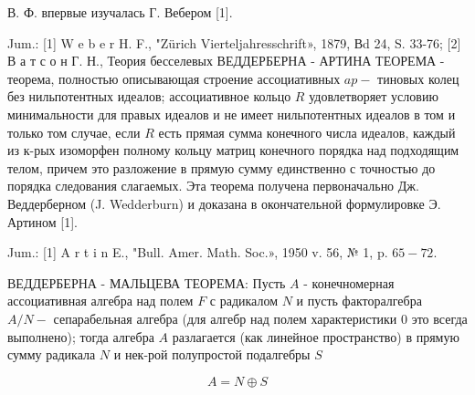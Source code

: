 \documentclass[10pt]{article}
\begin{document}
В. Ф. впервые изучалась $Г$. Вебером [1].



Jum.: [1] W e b e r H. F., "Zürich Vierteljahresschrift», 1879, Вd 24, S. 33-76; [2] В а т с о н Г. Н., Теория бесселевых ВЕДДЕРБЕРНА - АРТИНА ТЕОРЕМА - теорема, полностью описывающая строение ассоциативных $a p-$ тиновых колец без нильпотентных идеалов; ассоциативное кольцо $R$ удовлетворяет условию минимальности для правых идеалов и не имеет нильпотентных идеалов в том и только том случае, если $R$ есть прямая сумма конечного числа идеалов, каждый из к-рых изоморфен полному кольцу матриц конечного порядка над подходящим телом, причем это разложение в прямую сумму единственно с точностью до порядка следования слагаемых. Эта теорема получена первоначально Дж. Веддерберном (J. Wedderburn) и доказана в окончательной формулировке Э. Артином [1].



Jum.: [1] A r t i n E., "Bull. Amer. Math. Soc.», 1950 v. 56, № 1, p. $65-72$.



ВЕДДЕРБЕРНА - МАЛЬЦЕВА ТЕОРЕМА: Пусть $A$ - конечномерная ассоциативная алгебра над полем $F$ с радикалом $N$ и пусть факторалгебра $A / N-$ сепарабельная алгебра (для алгебр над полем характеристики 0 это всегда выполнено); тогда алгебра $A$ разлагается (как линейное пространство) в прямую сумму радикала $N$ и нек-рой полупростой подалгебры $S$



\[

A=N \oplus S

\]
\end{document}
